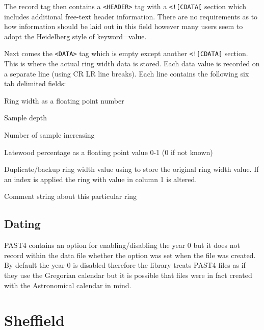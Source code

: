 \documentclass[10pt, headsepline,DIV14,BCOR0.5cm]{scrreprt}
\begin{document}
The record tag then contains a \verb|<HEADER>| tag with a \verb|<![CDATA[| section which includes additional free-text header information. There are no requirements as to how information should be laid out in this field however many users seem to adopt the Heidelberg style of keyword=value.

Next comes the \verb|<DATA>| tag which is empty except another \verb|<![CDATA[| section. This is where the actual ring width data is stored. Each data value is recorded on a separate line (using CR LR line breaks). Each line contains the following six tab delimited fields:

\begin{itemize*}
    \item  Ring width as a floating point number
    \item  Sample depth
    \item  Number of sample increasing
    \item  Latewood percentage as a floating point value 0-1 (0 if not known)
    \item  Duplicate/backup ring width value using to store the original ring width value. If an index is applied the ring with value in column 1 is altered.
    \item  Comment string about this particular ring 
\end{itemize*}

\section{Dating}

PAST4 contains an option for enabling/disabling the year 0 but it does not record within the data file whether the option was set when the file was created. By default the year 0 is disabled therefore the library treats PAST4 files as if they use the Gregorian calendar but it is possible that files were in fact created with the Astronomical calendar in mind. 


\chapter{Sheffield}
\end{document}
